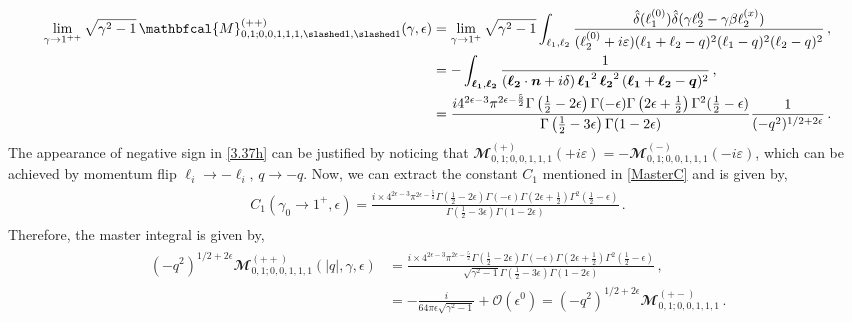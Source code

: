 \begin{align}
    \begin{split}
   \lim_{\gamma\to 1^{++}}     \sqrt{\gamma^2-1} \,\mathbfcal{M}_{0, 1; 0, 0, 1, 1, 1, \slashed 1, \slashed 1}^{(++)}(\gamma,\epsilon)&=\lim_{\gamma\to 1^{+}}\sqrt{\gamma^2-1}\int_{\ell_{1},\ell_{2}}\frac{{\hat\delta(\ell_{1}^{(0)})\hat\delta(\gamma \ell_{2}^{0}-\gamma\beta \ell_{2}^{(x)})}}{(\ell_{2}^{(0)}+i\varepsilon)(\ell_{1}+\ell_{2}-q)^2(\ell_{1}-q)^2(\ell_{2}-q)^2}\,,\\ &
   =-\int_{\boldsymbol{\ell_1},\boldsymbol{\ell_2}}\frac{1}{(\boldsymbol{\ell_2}\cdot \boldsymbol{n}+ i \delta)\,\boldsymbol{\ell_1}^2\,\boldsymbol{\ell_2}^2 \,(\boldsymbol{\ell_1}+\boldsymbol{\ell_2}-\boldsymbol{q})^2}\,,\\ &
   =\frac{i 4^{2 \epsilon -3} \pi ^{2 \epsilon -\frac{5}{2}} \Gamma \left(\frac{1}{2}-2 \epsilon \right) \Gamma (-\epsilon ) \Gamma \left(2 \epsilon +\frac{1}{2}\right)
   \Gamma^2(\frac{1}{2}-\epsilon)}{\Gamma \left(\frac{1}{2}-3 \epsilon \right) \Gamma(1-2\epsilon)}\frac{1}{(-q^2)^{1/2+2\epsilon}}\,.\label{3.37h}
    \end{split}
\end{align}
The appearance of negative sign in \eqref{3.37h} can be justified by noticing that $\mathbfcal{M}_{0,1;0,0,1,1,1}^{(+)}(+i\varepsilon)=-\mathbfcal{M}_{0,1;0,0,1,1,1}^{(-)}(-i\varepsilon)$, which can be achieved by momentum flip $\ell_i\to -\ell_i,\,q\to -q$. 
Now, we can extract the constant $C_1$ mentioned in \eqref{MasterC} and is given by,
\begin{align}
    \begin{split}
        C_1(\gamma_0\to 1^{+},\epsilon)=\frac{i\times 4^{2 \epsilon -3} \pi ^{2 \epsilon -\frac{5}{2}} \Gamma \left(\frac{1}{2}-2 \epsilon \right) \Gamma (-\epsilon ) \Gamma \left(2 \epsilon +\frac{1}{2}\right)
   \Gamma^2(\frac{1}{2}-\epsilon)}{\Gamma \left(\frac{1}{2}-3 \epsilon \right) \Gamma(1-2\epsilon)}\,.
    \end{split}
\end{align}
Therefore, the master integral is given by,
\begin{align}
    \begin{split}
       (-q^2)^{1/2+2\epsilon} \mathbfcal{M}_{0, 1; 0, 0, 1, 1, 1}^{(++)}(|q|,\gamma,\epsilon)&=\frac{i\times 4^{2 \epsilon -3} \pi ^{2 \epsilon -\frac{5}{2}}\Gamma \left(\frac{1}{2}-2 \epsilon \right) \Gamma (-\epsilon ) \Gamma \left(2 \epsilon +\frac{1}{2}\right)
   \Gamma^2(\frac{1}{2}-\epsilon)}{\sqrt{\gamma^2-1}\Gamma \left(\frac{1}{2}-3 \epsilon \right) \Gamma(1-2\epsilon)}\,,\\ &
       =-\frac{i}{64\pi \epsilon\sqrt{\gamma^2-1}}+\mathcal{O}(\epsilon^0)=  (-q^2)^{1/2+2\epsilon} \mathbfcal{M}_{0, 1; 0, 0, 1, 1, 1}^{(+-)}\,.
    \end{split}
\end{align}
